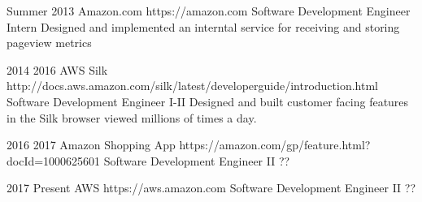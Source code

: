 \job
{Summer 2013} {}
{Amazon.com} {https://amazon.com}
{Software Development Engineer Intern}
{Designed and implemented an interntal service for receiving and storing pageview metrics}

\job
{2014} {2016}
{AWS Silk} {http://docs.aws.amazon.com/silk/latest/developerguide/introduction.html}
{Software Development Engineer I-II}
{Designed and built customer facing features in the Silk browser viewed millions of times a day.}

\job
{2016} {2017}
{Amazon Shopping App} {https://amazon.com/gp/feature.html?docId=1000625601}
{Software Development Engineer II}
{??}

\job
{2017} {Present}
{AWS} {https://aws.amazon.com}
{Software Development Engineer II}
{??}